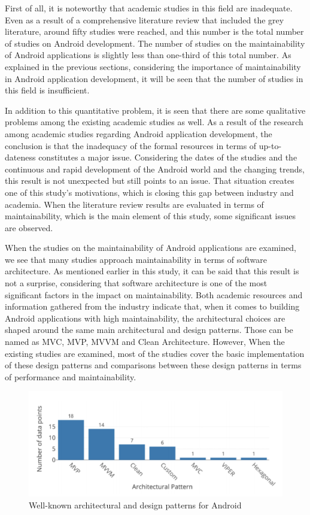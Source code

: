 First of all, it is noteworthy that academic studies in this field are inadequate. Even as a result of a comprehensive literature review that included the grey literature, around fifty studies were reached, and this number is the total number of studies on Android development. The number of studies on the maintainability of Android applications is slightly less than one-third of this total number. As explained in the previous sections, considering the importance of maintainability in Android application development, it will be seen that the number of studies in this field is insufficient. 

In addition to this quantitative problem, it is seen that there are some qualitative problems among the existing academic studies as well. As a result of the research among academic studies regarding Android application development, the conclusion is that the inadequacy of the formal resources in terms of up-to-dateness constitutes a major issue. Considering the dates of the studies and the continuous and rapid development of the Android world and the changing trends, this result is not unexpected but still points to an issue. That situation creates one of this study's motivations, which is closing this gap between industry and academia. When the literature review results are evaluated in terms of maintainability, which is the main element of this study, some significant issues are observed. 

When the studies on the maintainability of Android applications are examined, we see that many studies approach maintainability in terms of software architecture. As mentioned earlier in this study, it can be said that this result is not a surprise, considering that software architecture is one of the most significant factors in the impact on maintainability. Both academic resources and information gathered from the industry indicate that, when it comes to building Android applications with high maintainability, the architectural choices are shaped around the same main architectural and design patterns. Those can be named as MVC, MVP, MVVM and Clean Architecture. However, When the existing studies are examined, most of the studies cover the basic implementation of these design patterns and comparisons between these design patterns in terms of performance and maintainability. 
\begin{figure}[ht!]
    \centering
    \includegraphics[scale=0.5]{figures/pattern_usage.png}
    \caption{Well-known architectural and design patterns for Android \protect\cite{14}}
    \label{fig:arch_patterns}
\end{figure}


